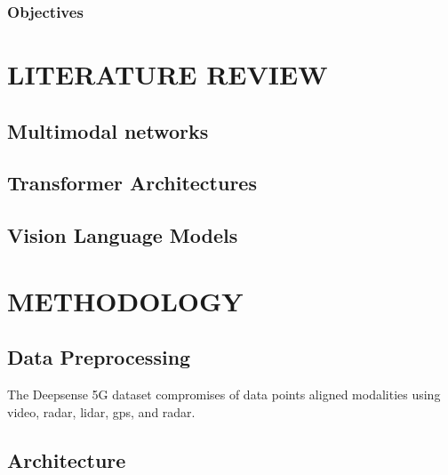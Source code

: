 \documentclass{UCF_ETD}
\begin{document}
\subsection{Objectives}


\chapter{LITERATURE REVIEW}



\section{Multimodal networks}

\section{Transformer Architectures}

\section{Vision Language Models}


\chapter{METHODOLOGY}
\section{Data Preprocessing}
The Deepsense 5G dataset compromises of data points aligned modalities using video, radar, lidar, gps, and radar.

\section{Architecture}
\end{document}
